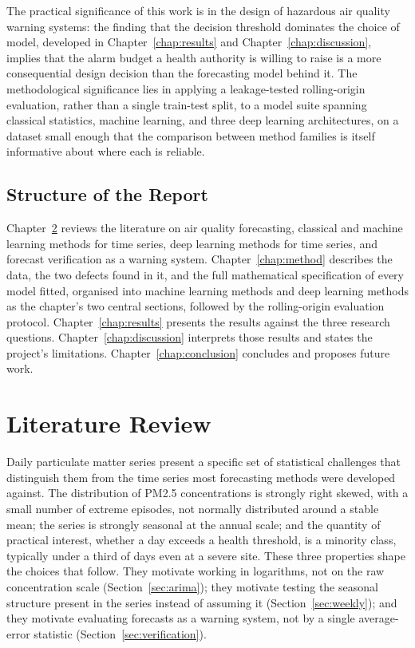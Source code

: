 \documentclass[12pt,a4paper]{report}
\begin{document}
The practical significance of this work is in the design of hazardous air
quality warning systems: the finding that the decision threshold dominates
the choice of model, developed in Chapter~\ref{chap:results} and
Chapter~\ref{chap:discussion}, implies that the alarm budget a health
authority is willing to raise is a more consequential design decision than
the forecasting model behind it. The methodological significance lies in
applying a leakage-tested rolling-origin evaluation, rather than a single
train-test split, to a model suite spanning classical statistics, machine
learning, and three deep learning architectures, on a dataset small enough that
the comparison between method families is itself informative about where
each is reliable.

\section{Structure of the Report}

Chapter~\ref{chap:lit} reviews the literature on air quality forecasting,
classical and machine learning methods for time series, deep learning methods
for time series, and forecast verification as a warning system.
Chapter~\ref{chap:method} describes the data, the two defects found in it,
and the full mathematical specification of every model fitted, organised
into machine learning methods and deep learning methods as the chapter's two
central sections, followed by the rolling-origin evaluation protocol.
Chapter~\ref{chap:results} presents the results against the three research
questions. Chapter~\ref{chap:discussion} interprets those results and states
the project's limitations. Chapter~\ref{chap:conclusion} concludes and
proposes future work.

\chapter{Literature Review}
\label{chap:lit}

Daily particulate matter series present a specific set of statistical
challenges that distinguish them from the time series most forecasting
methods were developed against. The distribution of PM2.5 concentrations is
strongly right skewed, with a small number of extreme episodes, not
normally distributed around a stable mean; the series is strongly seasonal
at the annual scale; and the quantity of practical interest, whether a day
exceeds a health threshold, is a minority class, typically under a third of
days even at a severe site. These three properties shape the choices that
follow. They motivate working in logarithms, not on the raw concentration
scale (Section~\ref{sec:arima}); they motivate testing the seasonal
structure present in the series instead of assuming it
(Section~\ref{sec:weekly}); and they motivate evaluating forecasts as a
warning system, not by a single average-error statistic
(Section~\ref{sec:verification}).
\end{document}
